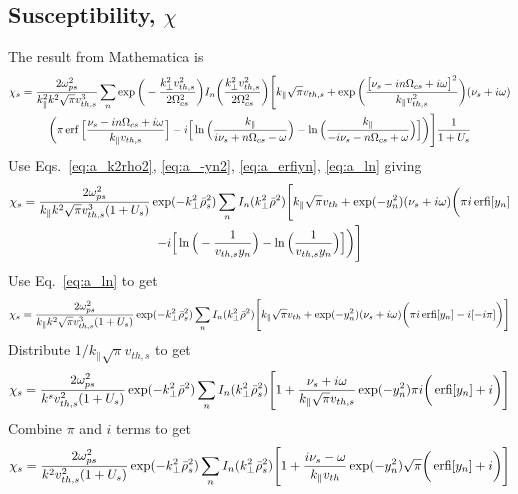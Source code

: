 \subsection{Susceptibility, $\chi$}
The result from Mathematica is
\begin{multline}
	\chi_s = \frac{2 \omega_{ps}^2}{k_\parallel^2 k^2 \sqrt{\pi} v_{th,s}^3}
		\sum_n \exp \bigg( - \frac{k_\perp^2 v_{th,s}^2}{2 \Omega_{cs}^2} \bigg)
		I_n \bigg( \frac{k_\perp^2 v_{th,s}^2}{2\Omega_{cs}^2}  \bigg)
		\Bigg[ k_\parallel \sqrt{\pi} v_{th,s} 
		+ \exp\bigg( \frac{\big[ \nu_s - i n\Omega_{cs} + i\omega  \big]^2}{k_\parallel v_{th,s}^2} \bigg) (\nu_s+i\omega) \\
		\bigg( \pi \operatorname{erf} \Big[ \frac{\nu_s - i n\Omega_{cs} + i\omega}{k_\parallel v_{th,s}} \Big]
		- i \Big[
		\ln \Big( \frac{k_\parallel}{i\nu_s+n\Omega_{cs}-\omega }\Big)
		- \ln \Big( \frac{k_\parallel}{-i\nu_s-n\Omega_{cs}+\omega }\Big)
		\Big] \bigg) \Bigg] 
		\frac{1}{1+U_s}
\end{multline}
Use Eqs.~\ref{eq:a_k2rho2}, \ref{eq:a_-yn2}, \ref{eq:a_erfiyn}, \ref{eq:a_ln} giving
\begin{multline}
	\chi_s = \frac{2 \omega_{ps}^2}{k_\parallel k^2 \sqrt{\pi} v_{th,s}^3 (1+U_s)}
	\exp(-k_\perp^2 \bar{\rho}_s^2) 
	\sum_n I_n(k_\perp^2 \bar{\rho}^2)
	\Bigg[k_\parallel \sqrt{\pi} v_{th} 
	+ \exp(-y_n^2) (\nu_s + i\omega)
	\bigg( \pi i \operatorname{erfi} [y_n]  \\
	- i \Big[ 
	\ln \Big( - \frac{1}{v_{th,s} y_n} \Big)
	- \ln \Big( \frac{1}{v_{th,s} y_n} \Big)
	\Big]
	\bigg)
	\Bigg]
\end{multline}
Use Eq.~\ref{eq:a_ln} to get
\begin{equation}
	\chi_s = \frac{2 \omega_{ps}^2}{k_\parallel k^2 \sqrt{\pi} v_{th,s}^3 (1+U_s)}
	\exp(-k_\perp^2 \bar{\rho}_s^2) 
	\sum_n I_n(k_\perp^2 \bar{\rho}^2)
	\Bigg[k_\parallel \sqrt{\pi} v_{th} 
	+ \exp(-y_n^2) (\nu_s + i\omega)
	\bigg( \pi i \operatorname{erfi} [y_n]  
	- i [- i \pi]
	\bigg)
	\Bigg]
\end{equation}
Distribute $1/k_\parallel \sqrt{\pi} v_{th,s}$ to get
\begin{equation}
	\chi_s = \frac{2\omega_{ps}^2}{k^s v_{th,s}^2 (1+U_s)}
	\exp(-k_\perp^2 \bar{\rho}^2)
	\sum_n I_n (k_\perp^2 \bar{\rho}_s^2)
	\Bigg[
	1 + \frac{\nu_s+i\omega}{k_\parallel \sqrt{\pi} v_{th,s}}
	\exp(-y_n^2) 
	\pi i 
	\bigg( \operatorname{erfi}[y_n] + i  \bigg)
	\Bigg]
\end{equation}
Combine $\pi$ and $i$ terms to get
\begin{equation}
	\chi_s = \frac{2 \omega_{ps}^2}{k^2 v_{th,s}^2 (1+U_s)} 
	\exp(-k_\perp^2 \bar{\rho}_s^2)
	\sum_n I_n (k_\perp^2 \bar{\rho}_s^2)
	\Bigg[
	1 + \frac{i \nu_s - \omega}{k_\parallel v_{th}}
	\exp(-y_n^2) 
	\sqrt{\pi}
	\bigg( 	\operatorname{erfi}[y_n] + i\bigg)
	\Bigg]
\end{equation}
